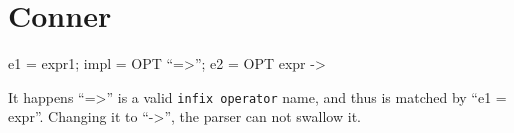 

\section{Conner}

\begin{ocamlcode}
e1 = expr1; impl = OPT ``=>''; e2 = OPT expr -> 
\end{ocamlcode}
It happens ``=>'' is a valid \verb|infix operator| name, and thus is matched
by ``e1 = expr''. Changing it to ``->'', the parser can not swallow it.
